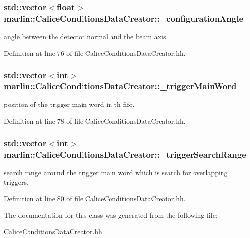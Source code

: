 \subsubsection[{\-\_\-configuration\-Angle}]{\setlength{\rightskip}{0pt plus 5cm}std\-::vector$<$float$>$ marlin\-::\-Calice\-Conditions\-Data\-Creator\-::\-\_\-configuration\-Angle\hspace{0.3cm}{\ttfamily [protected]}}\label{classmarlin_1_1CaliceConditionsDataCreator_ae54f3d9bb7f189e2b888c1f3a5aac59c}


angle between the detector normal and the beam axis. 



Definition at line 76 of file Calice\-Conditions\-Data\-Creator.\-hh.

\subsubsection[{\-\_\-trigger\-Main\-Word}]{\setlength{\rightskip}{0pt plus 5cm}std\-::vector$<$int$>$ marlin\-::\-Calice\-Conditions\-Data\-Creator\-::\-\_\-trigger\-Main\-Word\hspace{0.3cm}{\ttfamily [protected]}}\label{classmarlin_1_1CaliceConditionsDataCreator_a0459f44af2be6a6c11e129ec7a0f053c}


position of the trigger main word in th fifo. 



Definition at line 78 of file Calice\-Conditions\-Data\-Creator.\-hh.

\subsubsection[{\-\_\-trigger\-Search\-Range}]{\setlength{\rightskip}{0pt plus 5cm}std\-::vector$<$int$>$ marlin\-::\-Calice\-Conditions\-Data\-Creator\-::\-\_\-trigger\-Search\-Range\hspace{0.3cm}{\ttfamily [protected]}}\label{classmarlin_1_1CaliceConditionsDataCreator_a0e3e6e12b1a9177d4c233719db4978ca}


search range around the trigger main word which is search for overlapping triggers. 



Definition at line 80 of file Calice\-Conditions\-Data\-Creator.\-hh.



The documentation for this class was generated from the following file\-:\begin{DoxyCompactItemize}
\item 
Calice\-Conditions\-Data\-Creator.\-hh\end{DoxyCompactItemize}
